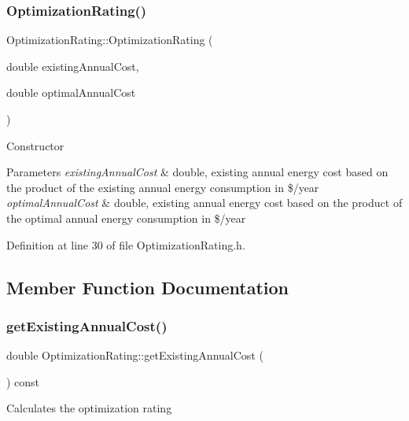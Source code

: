 \subsubsection{\texorpdfstring{Optimization\+Rating()}{OptimizationRating()}}
{\footnotesize\ttfamily Optimization\+Rating\+::\+Optimization\+Rating (\begin{DoxyParamCaption}\item[{double}]{existing\+Annual\+Cost,  }\item[{double}]{optimal\+Annual\+Cost }\end{DoxyParamCaption})\hspace{0.3cm}{\ttfamily [inline]}}

Constructor 
\begin{DoxyParams}{Parameters}
{\em existing\+Annual\+Cost} & double, existing annual energy cost based on the product of the existing annual energy consumption in \$/year \\
\hline
{\em optimal\+Annual\+Cost} & double, existing annual energy cost based on the product of the optimal annual energy consumption in \$/year \\
\hline
\end{DoxyParams}


Definition at line 30 of file Optimization\+Rating.\+h.



\subsection{Member Function Documentation}
\mbox{\label{class_optimization_rating_ac6e84aa94642911d089e464aae749ffe}} 
\subsubsection{\texorpdfstring{get\+Existing\+Annual\+Cost()}{getExistingAnnualCost()}}
{\footnotesize\ttfamily double Optimization\+Rating\+::get\+Existing\+Annual\+Cost (\begin{DoxyParamCaption}{ }\end{DoxyParamCaption}) const\hspace{0.3cm}{\ttfamily [inline]}}

Calculates the optimization rating

